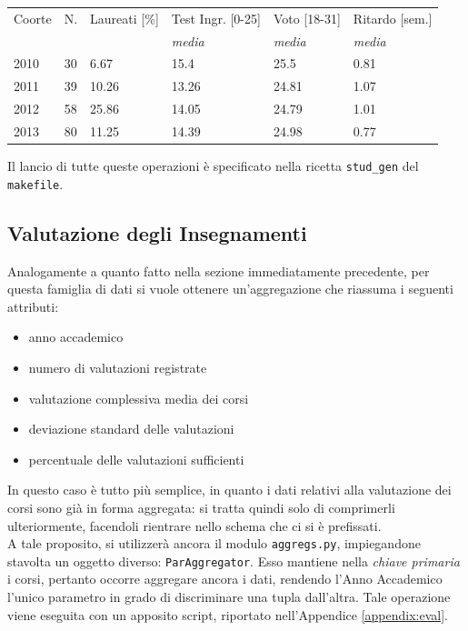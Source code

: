 		\noindent\begin{tabular}{llllll}
		\hline
		Coorte & N. & Laureati {[}\%{]} & Test Ingr. [0-25] & Voto [18-31] & Ritardo [sem.] \\
		 &  & & \textit{media} & \textit{media} & \textit{media}\\
		\hline
		2010 & 30 & 6.67 & 15.4 & 25.5 & 0.81 \\
		2011 & 39 & 10.26 & 13.26 & 24.81 & 1.07 \\
		2012 & 58 & 25.86 & 14.05 & 24.79 & 1.01 \\
		2013 & 80 & 11.25 & 14.39 & 24.98 & 0.77 \\ \hline
		\end{tabular}

		\vspace{0.4cm}

		Il lancio di tutte queste operazioni è specificato nella ricetta \texttt{stud\_gen} del \texttt{makefile}.

	\subsection{Valutazione degli Insegnamenti}
	\label{prepr:eval_min}

		Analogamente a quanto fatto nella sezione immediatamente precedente, per questa famiglia di dati si vuole ottenere un'aggregazione che riassuma i seguenti attributi:

		\begin{itemize}
			\item anno accademico
			\item numero di valutazioni registrate
			\item valutazione complessiva media dei corsi
			\item deviazione standard delle valutazioni
			\item percentuale delle valutazioni sufficienti
		\end{itemize}

		In questo caso è tutto più semplice, in quanto i dati relativi alla valutazione dei corsi sono già in forma aggregata: si tratta quindi solo di comprimerli ulteriormente, facendoli rientrare nello schema che ci si è prefissati. \\
		
		A tale proposito, si utilizzerà ancora il modulo \texttt{aggregs.py}, impiegandone stavolta un oggetto diverso: \texttt{ParAggregator}. Esso mantiene nella \textit{chiave primaria} i corsi, pertanto occorre aggregare ancora i dati, rendendo l'Anno Accademico l'unico parametro in grado di discriminare una tupla dall'altra. Tale operazione viene eseguita con un apposito script, riportato nell'Appendice \ref{appendix:eval}. \\


